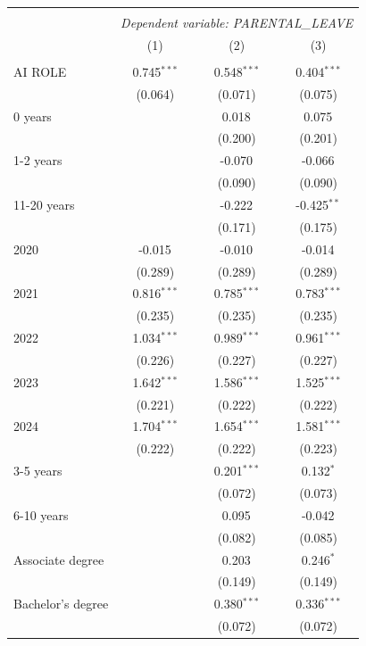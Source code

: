 \begin{table}[!htbp] \centering
\begin{tabular}{@{\extracolsep{5pt}}lccc}
\\[-1.8ex]\hline
\hline \\[-1.8ex]
& \multicolumn{3}{c}{\textit{Dependent variable: PARENTAL_LEAVE}} \
\cr \cline{2-4}
\\[-1.8ex] & (1) & (2) & (3) \\
\hline \\[-1.8ex]
 AI ROLE & 0.745$^{***}$ & 0.548$^{***}$ & 0.404$^{***}$ \\
& (0.064) & (0.071) & (0.075) \\
 0 years & & 0.018$^{}$ & 0.075$^{}$ \\
& & (0.200) & (0.201) \\
 1-2 years & & -0.070$^{}$ & -0.066$^{}$ \\
& & (0.090) & (0.090) \\
 11-20 years & & -0.222$^{}$ & -0.425$^{**}$ \\
& & (0.171) & (0.175) \\
 2020 & -0.015$^{}$ & -0.010$^{}$ & -0.014$^{}$ \\
& (0.289) & (0.289) & (0.289) \\
 2021 & 0.816$^{***}$ & 0.785$^{***}$ & 0.783$^{***}$ \\
& (0.235) & (0.235) & (0.235) \\
 2022 & 1.034$^{***}$ & 0.989$^{***}$ & 0.961$^{***}$ \\
& (0.226) & (0.227) & (0.227) \\
 2023 & 1.642$^{***}$ & 1.586$^{***}$ & 1.525$^{***}$ \\
& (0.221) & (0.222) & (0.222) \\
 2024 & 1.704$^{***}$ & 1.654$^{***}$ & 1.581$^{***}$ \\
& (0.222) & (0.222) & (0.223) \\
 3-5 years & & 0.201$^{***}$ & 0.132$^{*}$ \\
& & (0.072) & (0.073) \\
 6-10 years & & 0.095$^{}$ & -0.042$^{}$ \\
& & (0.082) & (0.085) \\
 Associate degree & & 0.203$^{}$ & 0.246$^{*}$ \\
& & (0.149) & (0.149) \\
 Bachelor's degree & & 0.380$^{***}$ & 0.336$^{***}$ \\
& & (0.072) & (0.072) \\

\end{tabular}
\end{table}
